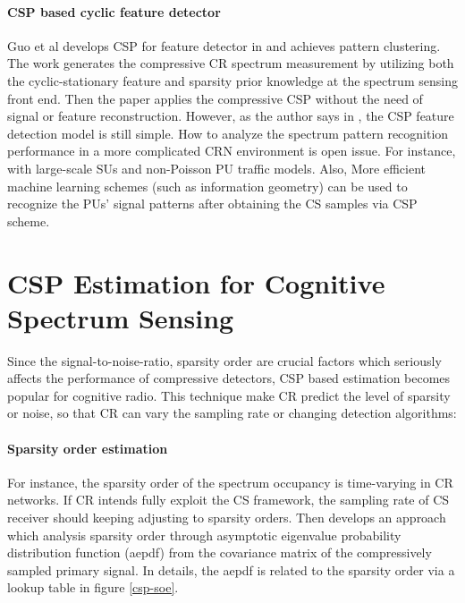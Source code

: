 \paragraph{CSP based cyclic feature detector}
Guo et al develops CSP for feature detector in \cite{guo2013feature} and achieves pattern clustering.
The work generates the compressive CR spectrum measurement by utilizing both the cyclic-stationary feature and sparsity prior knowledge at the spectrum sensing front end. Then the paper applies the compressive CSP without the need of signal or feature reconstruction. However, as the author says in \cite{guo2013feature}, the CSP feature detection model is still simple. How to analyze the spectrum pattern recognition performance in a more complicated CRN environment is open issue. For instance, with large-scale SUs and non-Poisson PU traffic models. Also, More efficient machine learning schemes (such as information geometry) can be used to recognize the PUs’ signal patterns after obtaining the CS samples via CSP scheme. 

\section{CSP Estimation for Cognitive Spectrum Sensing}\label{sct:csp_estim}
\indent \indent  Since the signal-to-noise-ratio, sparsity order are crucial factors which seriously affects the performance of compressive detectors, CSP based estimation becomes popular for cognitive radio. This technique make CR predict the level of sparsity or noise, so that CR can vary the sampling rate or changing detection algorithms:

\paragraph{Sparsity order estimation}
For instance, the sparsity order of the spectrum occupancy is time-varying in CR networks. If CR intends fully exploit the CS framework, the sampling rate of CS receiver should keeping adjusting to sparsity orders. Then \cite{sharma2014compressive} develops an approach which analysis sparsity order through asymptotic eigenvalue probability distribution function (aepdf) from the covariance matrix of the compressively sampled primary signal. In details, the aepdf is related to the sparsity order via a lookup table in figure \ref{csp-soe}. 

